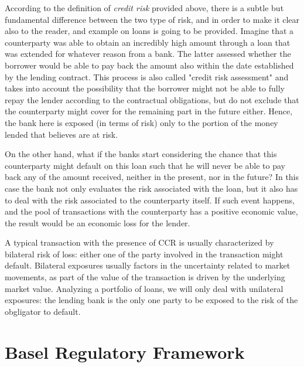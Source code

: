 \documentclass[a4paper,12pt]{article}
\begin{document}
        According to the definition of \textit{credit risk} provided above, there is a subtle but fundamental difference between the two type of risk, and in order to make it clear also to the reader, and example on loans is going
        to be provided. Imagine that a counterparty was able to obtain an incredibly high amount through a loan that was extended for whatever reason from a bank. The latter assessed whether the borrower would be able to 
        pay back the amount also within the date established by the lending contract. This process is also called "credit risk assessment" and takes into account the possibility that the borrower might not be able to fully repay the lender
        according to the contractual obligations, but do not exclude that the counterparty might cover for the remaining part in the future either. Hence, the bank here is exposed (in terms of risk) only to the portion of the money lended that
        believes are at risk. 
        
        On the other hand, what if the banks start considering the chance that this counterparty might default on this loan such that he will never be able to pay back any of the amount received, neither in the present, nor in the future?
        In this case the bank not only evaluates the risk associated with the loan, but it also has to deal with the risk associated to the counterparty itself. If such event happens, and the pool of transactions with the counterparty has a positive
        economic value, the result would be an economic loss for the lender. 

        A typical transaction with the presence of CCR is usually characterized by bilateral risk of loss: either one of the party involved in the transaction might default. 
        Bilateral exposures usually factors in the uncertainty related to market movements, as part of the value of the transaction is driven by the underlying market value.
        Analyzing a portfolio of loans, we will only deal with unilateral exposures: the lending bank is the only one party to be exposed to the risk of the obgligator to default.


    \pagebreak
    \section{Basel Regulatory Framework}
\end{document}
